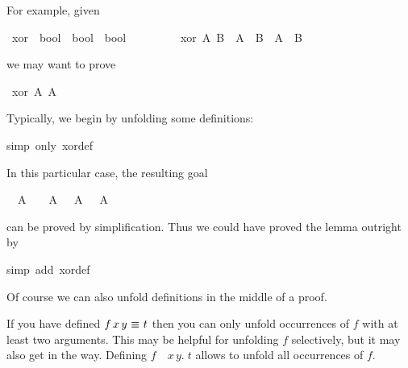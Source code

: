 \begin{isabellebody}
\begin{isamarkuptext}
For example, given%
\end{isamarkuptext}%
\isamarkuptrue%
\isamarkupfalse%
\ xor\ {\isacharcolon}{\isacharcolon}\ {\isachardoublequoteopen}bool\ {\isasymRightarrow}\ bool\ {\isasymRightarrow}\ bool{\isachardoublequoteclose}\isanewline
\ \ \ \ \ \ \ \ \ {\isachardoublequoteopen}xor\ A\ B\ {\isasymequiv}\ {\isacharparenleft}A\ {\isasymand}\ {\isasymnot}B{\isacharparenright}\ {\isasymor}\ {\isacharparenleft}{\isasymnot}A\ {\isasymand}\ B{\isacharparenright}{\isachardoublequoteclose}%
\begin{isamarkuptext}%
\noindent
we may want to prove%
\end{isamarkuptext}%
\isamarkuptrue%
\isamarkupfalse%
\ {\isachardoublequoteopen}xor\ A\ {\isacharparenleft}{\isasymnot}A{\isacharparenright}{\isachardoublequoteclose}%
\isadelimproof
%
\endisadelimproof
%
\isatagproof
%
\begin{isamarkuptxt}%
\noindent
Typically, we begin by unfolding some definitions:
%
\end{isamarkuptxt}%
\isamarkuptrue%
\isamarkupfalse%
{\isacharparenleft}simp\ only{\isacharcolon}\ xor{\isacharunderscore}def{\isacharparenright}%
\begin{isamarkuptxt}%
\noindent
In this particular case, the resulting goal
\begin{isabelle}%
\ {}{\isachardot}\ A\ {\isasymand}\ {\isasymnot}\ {\isasymnot}\ A\ {\isasymor}\ {\isasymnot}\ A\ {\isasymand}\ {\isasymnot}\ A%
\end{isabelle}
can be proved by simplification. Thus we could have proved the lemma outright by%
\end{isamarkuptxt}%
\isamarkuptrue%
%
\endisatagproof
{\isafoldproof}%
%
\isadelimproof
%
\endisadelimproof
%
\isadelimproof
%
\endisadelimproof
%
\isatagproof
{}\isamarkupfalse%
{\isacharparenleft}simp\ add{\isacharcolon}\ xor{\isacharunderscore}def{\isacharparenright}%
\endisatagproof
{\isafoldproof}%
%
\isadelimproof
%
\endisadelimproof
%
\begin{isamarkuptext}%
\noindent
Of course we can also unfold definitions in the middle of a proof.

\begin{warn}
  If you have defined $f\,x\,y~\emph{$\equiv$}~t$ then you can only unfold
  occurrences of $f$ with at least two arguments. This may be helpful for unfolding
  $f$ selectively, but it may also get in the way. Defining
  $f$~\isasymequiv~\isasymlambda$x\,y.\;t$ allows to unfold all occurrences of $f$.
\end{warn}


\end{isamarkuptext}
\end{isabellebody}
